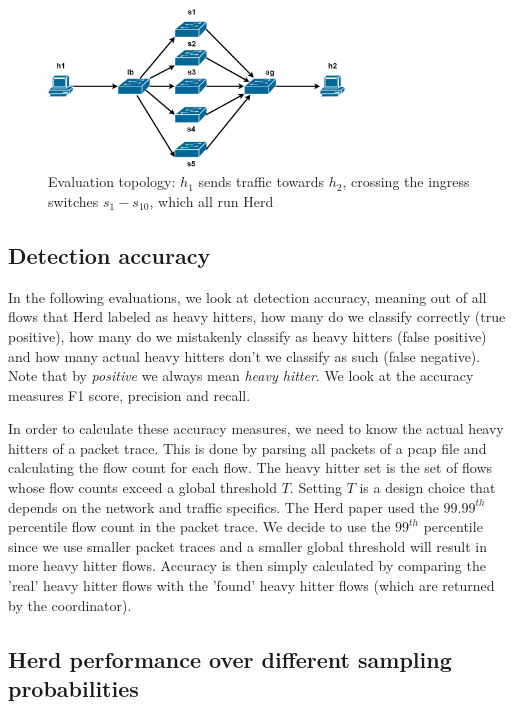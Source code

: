 \documentclass[11pt,oneside,a4paper]{article}
\begin{document}
\begin{figure}
	\centering
	\includegraphics[width=0.7\textwidth]{figures/Herd_topology}
	\caption{Evaluation topology: $h_1$ sends traffic towards $h_2$, crossing the ingress switches $s_1 - s_{10}$, which all run Herd}
	\label{fig:topology_fig}
\end{figure}

\subsection{Detection accuracy} \label{accuracy}

In the following evaluations, we look at detection accuracy, meaning out of all flows that Herd labeled as heavy hitters, how many do we classify correctly (true positive), how many do we mistakenly classify as heavy hitters (false positive) and how many actual heavy hitters don't we classify as such (false negative). Note that by \textit{positive} we always mean \textit{heavy hitter}. We look at the accuracy measures F1 score, precision and recall.

In order to calculate these accuracy measures, we need to know the actual heavy hitters of a packet trace. This is done by parsing all packets of a pcap file and calculating the flow count for each flow. The heavy hitter set is the set of flows whose flow counts exceed a global threshold $T$. Setting $T$ is a design choice that depends on the network and traffic specifics. The Herd paper used the $99.99^{th}$ percentile flow count in the packet trace. We decide to use the $99^{th}$ percentile since we use smaller packet traces and a smaller global threshold will result in more heavy hitter flows. Accuracy is then simply calculated by comparing the 'real' heavy hitter flows with the 'found' heavy hitter flows (which are returned by the coordinator).


\subsection{Herd performance over different sampling probabilities} \label{sampling_probability_evaluation}
\end{document}
